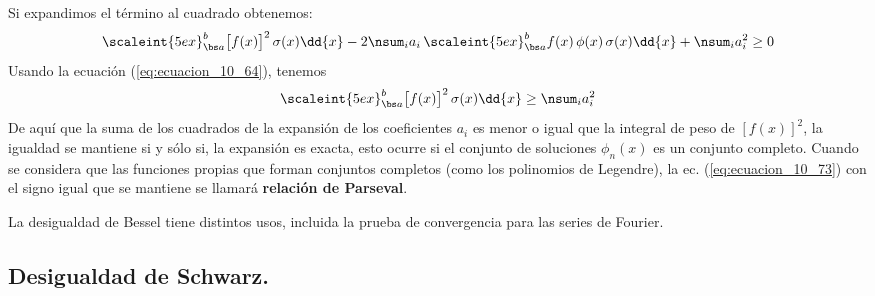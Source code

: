 Si expandimos el término al cuadrado obtenemos:
\begin{equation}
\scaleint{5ex}_{\bs a}^{b} \big[ f(x) \big]^{2} \, \sigma (x) \dd{x} - 2 \nsum_{i} a_{i} \, \scaleint{5ex}_{\bs a}^{b} f(x) \, \phi (x) \, \sigma (x) \dd{x} + \nsum_{i} a_{i}^{2} \geq 0
\label{eq:ecuacion_10_72}
\end{equation}
Usando la ecuación (\ref{eq:ecuacion_10_64}), tenemos
\begin{equation}
\scaleint{5ex}_{\bs a}^{b} \big[ f(x) \big]^{2} \, \sigma (x) \dd{x} \geq \nsum_{i} a_{i}^{2}
\label{eq:ecuacion_10_73}
\end{equation}
De aquí que la suma de los cuadrados de la expansión de los coeficientes $a_{i}$ es menor o igual que la integral de peso de $[f(x)]^{2}$, la igualdad se mantiene si y sólo si, la expansión es exacta, esto ocurre si el conjunto de soluciones $\phi_{n}(x)$ es un conjunto completo. Cuando se considera que las funciones propias que forman conjuntos completos (como los polinomios de Legendre), la ec. (\ref{eq:ecuacion_10_73}) con el signo igual que se mantiene se llamará \textbf{relación de Parseval}.
\par
La desigualdad de Bessel tiene distintos usos, incluida la prueba de convergencia para las series de Fourier.

\subsection{Desigualdad de Schwarz.}

